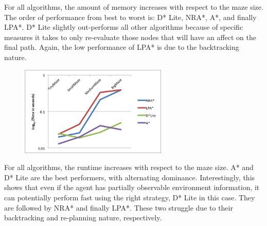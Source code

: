 	For all algorithms, the amount of memory increases with respect to the maze size. The order of performance from best to worst is: D* Lite, NRA*, A*, and finally LPA*. D* Lite slightly out-performs all other algorithms because of specific measures it takes to only re-evaluate those nodes that will have an affect on the final path. Again, the low performance of LPA* is due to the backtracking nature.  

	\begin{figure}[htb!]
		\centering
		\includegraphics[width=7cm]{Time.png}
		\caption{}
		\label{fig:4}
	\end{figure}

	For all algorithms, the runtime  increases with respect to the maze size. A* and D* Lite are the best performers, with alternating dominance. Interestingly, this shows that even if the agent has partially observable environment information, it can potentially perform fast using the right strategy, D* Lite in this case. They are followed by NRA* and finally LPA*. These two struggle due to their backtracking and re-planning nature, respectively.
	